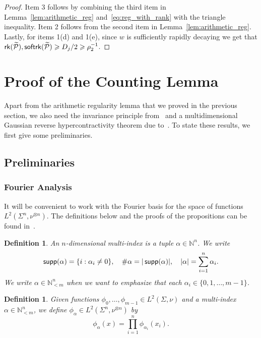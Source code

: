 \documentclass[10pt,a4paper]{amsart}
\newtheorem{definition}[thm]{Definition}
\renewcommand\geq{\geqslant}
\newcommand{\V}[1]{{#1}}
\begin{document}
\begin{proof}
    Item 3 follows by combining the third item in Lemma~\ref{lem:arithmetic_reg} and~\eqref{eq:reg_with_rank} with the triangle inequality. Item 2 follows from the second item in Lemma~\ref{lem:arithmetic_reg}.
    Lastly, for items 1(d) and 1(e), since $w$ is sufficiently rapidly decaying we get that
    ${\sf rk}(\widetilde{\mathcal{P}}),{\sf softrk}(\widetilde{\mathcal{P}})\geq D_{j}/2\geq \rho_2^{-1}$.
\end{proof}

\section{Proof of the Counting Lemma}\label{sec:proof_of_main}


Apart from the arithmetic regularity lemma that we proved in the previous section, we also need the invariance principle from~\cite{Mossel} and a multidimensional Gaussian reverse hypercontractivity theorem due to~\cite{ChenDafnisPaouris2015HolderGaussian}. To state these results, we first give some preliminaries.

\subsection{Preliminaries}
\subsubsection{Fourier Analysis}
It will be convenient to work with the Fourier basis for the space of functions $L^2(\Sigma^n, \nu^{\otimes n})$. The definitions below and the proofs of the propositions can be found in~\cite{O14}.

\begin{definition}
	An $n$-dimensional \textit{multi-index} is a tuple $\alpha \in \mathbb{N}^n$. We write
	\[
	{\sf supp}(\alpha) = \{i : \alpha_i \neq 0\}, \quad \#\alpha = |\operatorname{\sf supp}(\alpha)|, \quad |\alpha| = \sum_{i=1}^{n} \alpha_i.
	\]
	We write $\alpha \in \mathbb{N}^n_{<m}$ when we want to emphasize that each $\alpha_i \in \{0,1,\dots,m-1\}$.
\end{definition}

\begin{definition}\label{def:fourier_basis}
	Given functions $\phi_0, \dots, \phi_{m-1} \in L^2(\Sigma, \nu)$ and a multi-index $\alpha \in \mathbb{N}^n_{<m}$, we define $\phi_{\alpha} \in L^2(\Sigma^n, \nu^{\otimes n})$ by
	\[
	\phi_{\alpha}(\V x) = \prod_{i=1}^{n} \phi_{\alpha_i}(x_i).
	\]
\end{definition}
\end{document}
